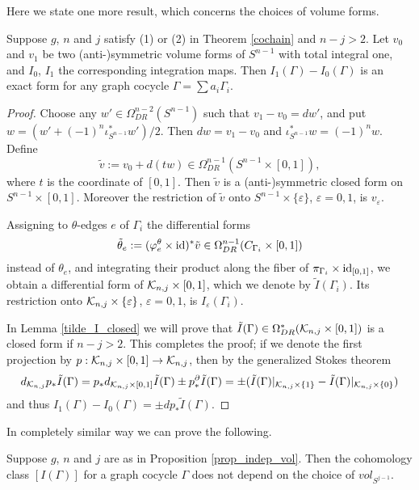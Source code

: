 Here we state one more result, which concerns the choices of volume forms.



\begin{prop}\label{prop_indep_vol}
Suppose $g$, $n$ and $j$ satisfy (1) or (2) in Theorem \ref{cochain} and $n-j>2$.
Let $v_0$ and $v_1$ be two (anti-)symmetric volume forms of $S^{n-1}$ with total integral one, and $I_0$, $I_1$ the
corresponding integration maps.
Then $I_1 (\Gamma ) - I_0 (\Gamma )$ is an exact form for any  graph cocycle $\Gamma = \sum a_i \Gamma_i$.
\end{prop}


\begin{proof}
Choose any $w' \in \Omega^{n-2}_{DR}(S^{n-1})$ such that $v_1 -v_0 =dw'$, and put $w=(w' +(-1)^n \iota^*_{S^{n-1}}w')/2$.
Then $dw=v_1 -v_0$ and $\iota^*_{S^{n-1}}w = (-1)^n w$.
Define
\[
 \tilde{v} := v_0 +d(tw) \in \Omega^{n-1}_{DR}(S^{n-1}\times [0,1]),
\]
where $t$ is the coordinate of $[0,1]$.
Then $\tilde{v}$ is a (anti-)symmetric closed form on $S^{n-1}\times [0,1]$.
Moreover the restriction of $\tilde{v}$ onto $S^{n-1}\times \{ \varepsilon \}$, $\varepsilon =0,1$, is $v_{\varepsilon}$.


Assigning to $\theta$-edges $e$ of $\Gamma_i$ the differential forms
\[
 \tilde{\theta}_e := (\varphi^{\theta}_e \times \mathrm{id} )^* \tilde{v} \in \Omega^{n-1}_{DR}(C_{\Gamma_i} \times [0,1])
\]
instead of $\theta_e$, and integrating their product along the fiber of $\pi_{\Gamma_i}\times \mathrm{id}_{[0,1]}$,
we obtain a differential form of $\mathcal{K}_{n ,j} \times [0,1]$, which we denote by
$\tilde{I}(\Gamma_i )$.
Its restriction onto $\mathcal{K}_{n ,j} \times \{ \varepsilon \}$, $\varepsilon =0,1$, is $I_{\varepsilon}(\Gamma_i )$.


In Lemma \ref{tilde_I_closed} we will prove that $\tilde{I} (\Gamma ) \in \Omega^*_{DR}(\mathcal{K}_{n ,j} \times [0,1])$
is a closed form if $n-j >2$.
This completes the proof; if we denote the first projection by $p: \mathcal{K}_{n ,j} \times [0,1] \to \mathcal{K}_{n ,j}$, then
by the generalized Stokes theorem
\[
 d_{\mathcal{K}_{n ,j}}p_* \tilde{I}(\Gamma )
 = p_* d_{\mathcal{K}_{n ,j} \times [0,1]} \tilde{I}(\Gamma ) \pm p^{\partial}_* \tilde{I}(\Gamma ) 
 = \pm (\tilde{I}(\Gamma )|_{\mathcal{K}_{n ,j}\times \{1 \}} - \tilde{I}(\Gamma )|_{\mathcal{K}_{n ,j}\times \{0 \}})
\]
and thus $I_1 (\Gamma ) - I_0 (\Gamma ) = \pm d p_* \tilde{I}(\Gamma )$.
\end{proof}


In completely similar way we can prove the following.


\begin{prop}\label{prop_indep_vol2}
Suppose $g$, $n$ and $j$ are as in Proposition \ref{prop_indep_vol}.
Then the cohomology class $[I(\Gamma )]$ for a graph cocycle $\Gamma$ does not depend on the choice of $vol_{S^{j-1}}$.
\end{prop}